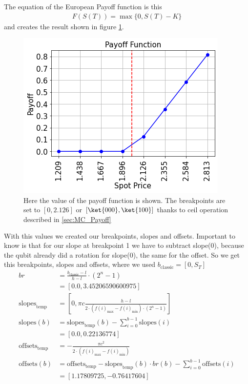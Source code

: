\documentclass[../main.tex]{subfiles}
\begin{document}
The equation of the European Payoff function is this
\begin{align}
    F(S(T)) = \max\{0, S(T) - K\} \label{eq:E_example_european}
\end{align}
and creates the result shown in figure \ref{fig:E_payoff_function}.
\begin{figure}[H]
  \begin{center}
    \includegraphics[width=0.5\linewidth]{../../images/payoff_european.png}
  \end{center}
  \caption{Here the value of the payoff function is shown. The breakpoints are set to $[0, 2.126]$ or $[\ket{000}, \ket{100}]$ thanks to ceil operation described in \ref{sec:MC_Payoff}}
  \label{fig:E_payoff_function}
\end{figure}

With this values we created our breakpoints, slopes and offsets. Important to know is that for our slope at breakpoint 1 we have to subtract slope(0), because the qubit already did a rotation for slope(0), the same for the offset. So we get this breakpoints, slopes and offsets, where we used $b_{\text{classic}} = [0, S_T ]$
\begin{align}
    br &= \frac{b_{\text{classic}}-l}{h-l} \cdot (2^{n}-1) \nonumber \\
    &= [0.0, 3.45206590600975] \nonumber \\
    \text{slopes}_\text{temp} &= [0, \pi c\frac{h-l}{2\cdot (f(i)_\text{max}-f(i)_\text{min}) \cdot(2^{n}-1)}] \nonumber \\
    \text{slopes}(b) &= \text{slopes}_\text{temp}(b) - \sum_{i=0}^{b-1} \text{slopes}(i) \nonumber \\
     &= [0.0,         0.22136774] \nonumber \\
    \text{offsets}_\text{temp} &= - \frac{\pi c^2}{2\cdot (f(i)_\text{max}-f(i)_\text{min})} \nonumber \\
    \text{offsets}(b) &= \text{offsets}_\text{temp} - \text{slopes}_\text{temp}(b) \cdot br(b) - \sum_{i=0}^{b-1} \text{offsets}(i) \nonumber \\
    &= [ 1.17809725, -0.76417604] \nonumber
\end{align}
\end{document}
